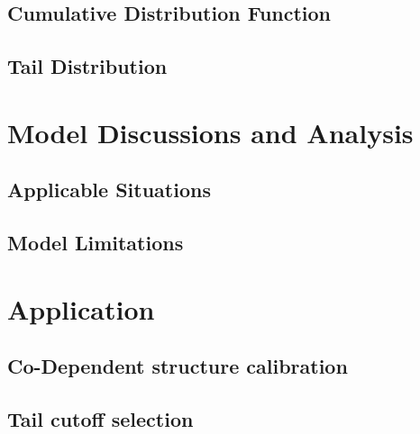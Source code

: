 \documentclass{article}
\begin{document}
\subsection{Cumulative Distribution Function}



\subsection{Tail Distribution}


\section{Model Discussions and Analysis}

\subsection{Applicable Situations}

\subsection{Model Limitations}


\section{Application}

\subsection{Co-Dependent structure calibration}

\subsection{Tail cutoff selection}
\end{document}

